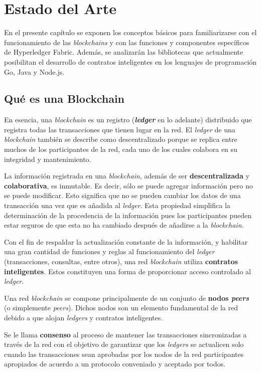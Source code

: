 \chapter{Estado del Arte}\label{chapter:state-of-the-art}

En el presente capítulo se exponen los conceptos básicos para familiarizarse con el funcionamiento de las \textit{blockchains} y con las funciones y componentes específicos de Hyperledger Fabric. Además, se analizarán las bibliotecas que  actualmente posibilitan el desarrollo de contratos inteligentes en los lenguajes de programación Go, Java y Node.js.

\section{Qué es una Blockchain}
En esencia, una \textit{blockchain} es un registro (\textbf{\textit{ledger}} en lo adelante) distribuido que registra todas las transacciones que tienen lugar en la red. El \textit{ledger} de una \textit{blockchain} también se describe como descentralizado porque se replica entre muchos de los participantes de la red, cada uno de los cuales colabora en su integridad y mantenimiento.

La información registrada en una \textit{blockchain}, además de ser \textbf{descentralizada} y \textbf{colaborativa}, es inmutable. Es decir, sólo se puede agregar información pero no se puede modificar. Esto significa que no se pueden cambiar los datos de una transacción una vez que es añadida al \textit{ledger}. Esta propiedad simplifica la determinación de la procedencia de la información pues los participantes pueden estar seguros de que esta no ha cambiado después de añadirse a la \textit{blockchain}.

Con el fin de respaldar la actualización constante de la información, y  habilitar una gran cantidad de funciones y reglas al funcionamiento del \textit{ledger} (transacciones, consultas, entre otros), una red  \textit{blockchain} utiliza \textbf{contratos inteligentes}. Estos constituyen una forma de proporcionar acceso controlado al \textit{ledger}.

Una red  \textit{blockchain} se compone principalmente de un conjunto de \textbf{nodos \textit{peers}} (o simplemente \textit{peers}). Dichos nodos son un elemento fundamental de la red debido a que alojan \textit{ledgers} y contratos inteligentes.

Se le llama \textbf{consenso} al proceso de mantener las transacciones sincronizadas a través de la red con el objetivo de garantizar que los \textit{ledgers} se actualicen solo cuando las transacciones sean aprobadas por los nodos de la red participantes apropiados de acuerdo a un protocolo conveniado y aceptado por todos.

